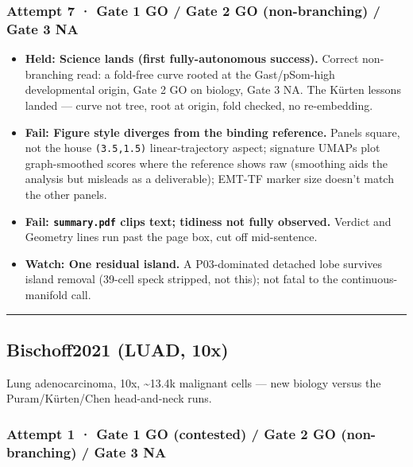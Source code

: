 \documentclass[11pt,a4paper]{article}
\providecommand{\tightlist}{\setlength{\itemsep}{0pt}\setlength{\parskip}{0pt}}
\begin{document}
\hypertarget{attempt-7-gate-1-go-gate-2-go-non-branching-gate-3-na}{%
\subsubsection{Attempt 7 · Gate 1 GO / Gate 2 GO (non-branching) / Gate
3 NA}\label{attempt-7-gate-1-go-gate-2-go-non-branching-gate-3-na}}

\begin{itemize}
\tightlist
\item
  \textbf{Held: Science lands (first fully-autonomous success).}
  Correct non-branching read: a fold-free curve rooted at the
  Gast/pSom-high developmental origin, Gate 2 GO on biology, Gate 3 NA.
  The Kürten lessons landed --- curve not tree, root at origin, fold
  checked, no re-embedding.
\item
  \textbf{Fail: Figure style diverges from the binding reference.}
  Panels square, not the house \texttt{(3.5,1.5)} linear-trajectory
  aspect; signature UMAPs plot graph-smoothed scores where the reference
  shows raw (smoothing aids the analysis but misleads as a deliverable);
  EMT-TF marker size doesn't match the other panels.
\item
  \textbf{Fail: \texttt{summary.pdf} clips text; tidiness not fully
  observed.} Verdict and Geometry lines run past the page box, cut off
  mid-sentence.
\item
  \textbf{Watch: One residual island.} A P03-dominated detached lobe
  survives island removal (39-cell speck stripped, not this); not fatal
  to the continuous-manifold call.
\end{itemize}

\begin{center}\rule{0.5\linewidth}{0.5pt}\end{center}

\hypertarget{bischoff-2021-luad-10x}{%
\subsection{Bischoff2021 (LUAD, 10x)}\label{bischoff-2021-luad-10x}}

Lung adenocarcinoma, 10x, \textasciitilde13.4k malignant cells --- new
biology versus the Puram/Kürten/Chen head-and-neck runs.

\hypertarget{attempt-1-gate-1-go-contested-gate-2-go-non-branching-gate-3-na}{%
\subsubsection{Attempt 1 · Gate 1 GO (contested) / Gate 2 GO
(non-branching) / Gate 3
NA}\label{attempt-1-gate-1-go-contested-gate-2-go-non-branching-gate-3-na}}
\end{document}
